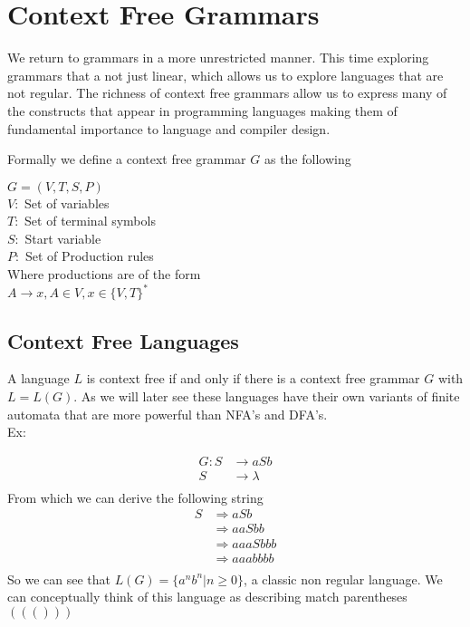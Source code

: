 \documentclass[11pt]{exam}
\begin{document}
\newpage

\section{Context Free Grammars}

We return to grammars in a more unrestricted manner. This time exploring grammars that a not just linear, which allows us to explore languages that are not regular. The richness of context free grammars allow us to express many of the constructs that appear in programming languages making them of fundamental importance to language and compiler design.

Formally we define a context free grammar $G$ as the following 

\begin{center}
$G = (V,T,S,P)$\\
$V:$ Set of variables\\
$T:$ Set of terminal symbols\\
$S:$ Start variable\\
$P:$ Set of Production rules\\
Where productions are of the form\\
$A \rightarrow x, A \in V, x \in \{V,T\}^*$
\end{center}

\subsection{Context Free Languages}
A language $L$ is context free if and only if there is a context free grammar $G$ with $L = L(G)$. As we will later see these languages have their own variants of finite automata that are more powerful than NFA's and DFA's.\\

Ex:
\begin{center}
\begin{align*}
G: S &\rightarrow aSb\\
   S &\rightarrow \lambda\\
\end{align*}
From which we can derive the following string
\begin{align*}
S &\Rightarrow aSb\\
  &\Rightarrow aaSbb\\
  &\Rightarrow aaaSbbb\\
  &\Rightarrow aaabbbb\\
\end{align*}
So we can see that $L(G) = \{a^nb^n | n \geq 0 \}$, a classic non regular language. We can conceptually think of this language as describing match parentheses $((()))$
\end{center}
\end{document}
